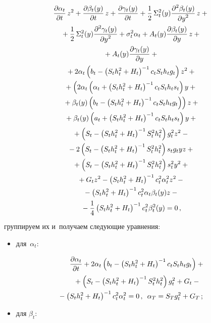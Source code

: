 \begin{multicols}{2}
          \noindent
     \begin{multline*}
     \displaystyle\frac{\displaystyle \partial \alpha_t\mathstrut}{\displaystyle \partial t\mathstrut}\, z^2 +\displaystyle\frac{\displaystyle \partial \beta_t(y)\mathstrut}{\displaystyle \partial t\mathstrut}\,z +
     \displaystyle\frac{\displaystyle \partial \gamma_t(y)\mathstrut}{\displaystyle \partial 
t\mathstrut}+\displaystyle\frac{\displaystyle 1\mathstrut}{\displaystyle 2\mathstrut}\,\Sigma_t^2(y)\displaystyle\frac{\displaystyle \partial^2\beta_t(y)\mathstrut}{\displaystyle \partial y^2\mathstrut}\,z+ {}\\
{}+
\displaystyle\frac{\displaystyle 1\mathstrut}{\displaystyle 2\mathstrut}\,\Sigma_t^2(y)\displaystyle\frac{\displaystyle \partial^2\gamma_t(y)\mathstrut}{\displaystyle \partial 
y^2\mathstrut}+\sigma_t^2\alpha_t+A_t(y)\displaystyle\frac{\displaystyle \partial \beta_t(y)\mathstrut}{\displaystyle \partial y\mathstrut}\,z +{}\\
{}+A_t(y) \displaystyle\frac{\displaystyle \partial 
\gamma_t(y)\mathstrut}{\displaystyle \partial y\mathstrut}+{}\\
{}+ 2\alpha_t \left( b_t -\left( S_t h_t^2+H_t\right)^{-1} c_t 
S_t h_t g_t \right)z^2+{}\\
     {}+
     \left( 2\alpha_t\left( \alpha_t+\left( S_t h_t^2+H_t\right)^{-1} c_t S_t h_t 
s_t\right)y +{}\right.\\
\left.{}+\beta_t(y) \left( b_t-\left( S_t h_t^2+H_t\right)^{-1} c_t S_t h_t 
g_t\right) \right) z+{}\\
     {}+\beta_t(y)\left( a_t +\left( S_t h_t^2+H_t\right)^{-1} c_t S_t h_t s_t\right) 
y+{}\\
{}+ \left( S_t -\left( S_t h_t^2+H_t\right)^{-1} S_t^2 h_t^2\right) g_t^2 z^2-{}\\
     {}- 2\left( S_t -\left( S_t h_t^2+H_t\right)^{-1} S_t^2 h_t^2\right) s_t g_t yz 
+{}\\
{}+
     \left( S_t-\left( S_t h_t^2+H_t\right)^{-1} S_t^2 h_t^2\right) s_t^2 y^2+{}\\
     {}+G_t z^2 -\left( S_t h_t^2 +H_t\right)^{-1} c_t^2 \alpha_t^2 z^2 -{}\\
     {}-\left( 
S_t h_t^2+H_t\right)^{-1} c_t^2 \alpha_t \beta_t(y) z-{}\\
{}-
\displaystyle\frac{\displaystyle 1\mathstrut}{\displaystyle 4\mathstrut}\left( S_t h_t^2+H_t\right)^{-1}  c_t^2 \beta_t^2(y)=0\,,
     \end{multline*}
группируем их и~получаем сле\-ду\-ющие уравнения:
\begin{itemize}
\item  для~$\alpha_t$:

\noindent
\begin{multline}
\fr{\partial\alpha_t}{\partial t}+2\alpha_t\left( b_t-\left( S_t h_t^2+H_t\right)^{-1} c_t 
S_t h_t g_t\right)+{}\\
{}+ \left( S_t- \left( S_t h_t^2+H_t\right)^{-1} S_t^2 h_t^2\right) 
g_t^2+G_t-{}\\
\hspace*{-8mm}{}-\left( S_t h_t^2+H_t\right)^{-1} c_t^2 \alpha_t^2 =0\,,\enskip \alpha_T=S_T 
g_t^2+G_T\,;\!\!
\label{e18-bos}
\end{multline}
\item для $\beta_t$:


\end{itemize}
\end{multicols}
